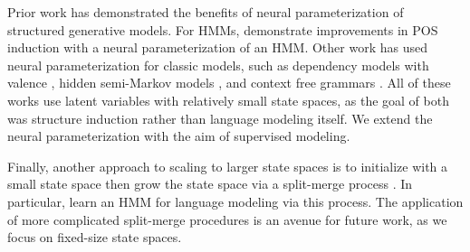 \documentclass[11pt,a4paper]{article}
\begin{document}
Prior work has demonstrated the benefits of neural parameterization of structured generative models. 
For HMMs, \citet{tran2016hmm} demonstrate improvements in POS induction with a
neural parameterization of an HMM.
Other work has used neural parameterization for classic models, such as 
dependency models with valence \citep{han2017dependency},
hidden semi-Markov models \citep{wiseman2018hsmm},
and context free grammars \citep{kim2019cpcfg}.
All of these works use latent variables with relatively small state spaces,
as the goal of both was structure induction rather than language modeling itself.
We extend the neural parameterization with the aim of supervised modeling.

Finally, another approach to scaling to larger state spaces is to initialize
with a small state space then grow the state space via a split-merge process
\citep{petrov2006splitmerge,huang2011thesis}.
In particular, \citet{huang2011thesis} learn an HMM for language modeling
via this process.
The application of more complicated split-merge
procedures is an avenue for future work,
as we focus on fixed-size state spaces.

\end{document}
